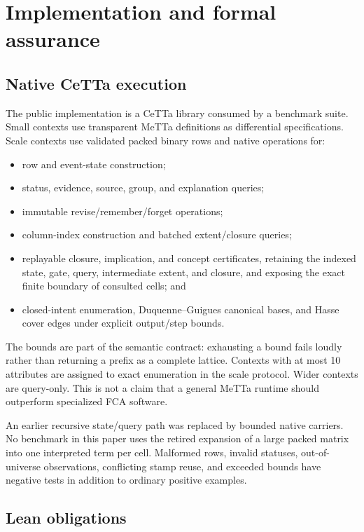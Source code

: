\documentclass[11pt]{article}
\begin{document}
\section{Implementation and formal assurance}
\label{sec:implementation}

\subsection{Native CeTTa execution}

The public implementation is a CeTTa library consumed by a benchmark suite.
Small contexts use transparent MeTTa definitions as differential
specifications. Scale contexts use validated packed binary rows and native
operations for:
\begin{itemize}
  \item row and event-state construction;
  \item status, evidence, source, group, and explanation queries;
  \item immutable revise/remember/forget operations;
  \item column-index construction and batched extent/closure queries;
  \item replayable closure, implication, and concept certificates, retaining
        the indexed state, gate, query, intermediate extent, and closure, and
        exposing the exact finite boundary of consulted cells; and
  \item closed-intent enumeration, Duquenne--Guigues canonical bases, and
        Hasse cover edges under explicit output/step bounds.
\end{itemize}

The bounds are part of the semantic contract: exhausting a bound fails loudly
rather than returning a prefix as a complete lattice. Contexts with at most
10 attributes are assigned to exact enumeration in the scale protocol. Wider
contexts are query-only. This is not a claim that a general MeTTa runtime
should outperform specialized FCA software.

An earlier recursive state/query path was replaced by bounded native carriers.
No benchmark in this paper uses the retired expansion of a large packed matrix
into one interpreted term per cell. Malformed rows, invalid statuses,
out-of-universe observations, conflicting stamp reuse, and exceeded bounds
have negative tests in addition to ordinary positive examples.

\subsection{Lean obligations}
\end{document}
